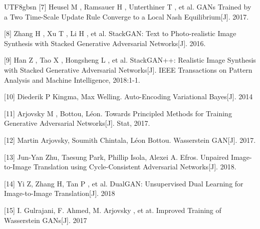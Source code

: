 \documentclass{article}
\begin{document}
\begin{CJK*}{UTF8}{gbsn}
[7] Heusel M , Ramsauer H , Unterthiner T , et al. GANs Trained by a Two Time-Scale Update Rule Converge to a Local Nash Equilibrium[J]. 2017.

[8] Zhang H , Xu T , Li H , et al. StackGAN: Text to Photo-realistic Image Synthesis with Stacked Generative Adversarial Networks[J]. 2016.

[9] Han Z , Tao X , Hongsheng L , et al. StackGAN++: Realistic Image Synthesis with Stacked Generative Adversarial Networks[J]. IEEE Transactions on Pattern Analysis and Machine Intelligence, 2018:1-1.

[10] Diederik P Kingma, Max Welling. Auto-Encoding Variational Bayes[J]. 2014

[11] Arjovsky M , Bottou, Léon. Towards Principled Methods for Training Generative Adversarial Networks[J]. Stat, 2017.

[12] Martin Arjovsky, Soumith Chintala, Léon Bottou. Wasserstein GAN[J]. 2017.

[13] Jun-Yan Zhu, Taesung Park, Phillip Isola, Alexei A. Efros. Unpaired Image-to-Image Translation using Cycle-Consistent Adversarial Networks[J]. 2018.

[14] Yi Z, Zhang H, Tan P , et al. DualGAN: Unsupervised Dual Learning for Image-to-Image Translation[J]. 2018

[15] I. Gulrajani, F. Ahmed, M. Arjovsky , et at. Improved Training of Wasserstein GANs[J]. 2017

\end{CJK*}
\end{document}
